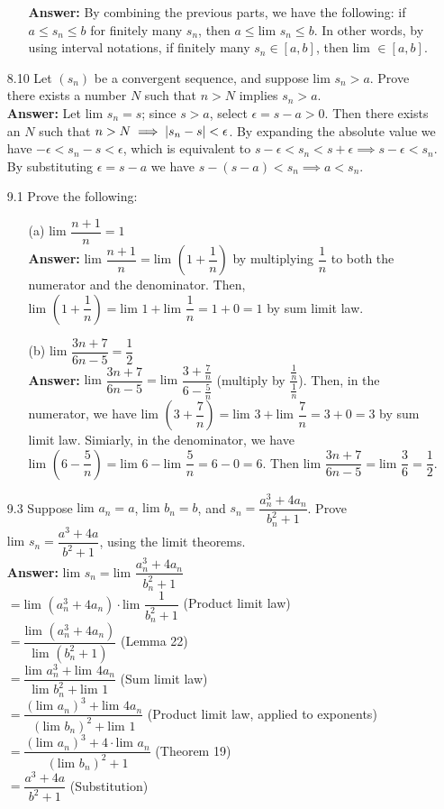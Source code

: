 \documentclass{article}
\begin{document}
\begin{itemize}
\begin{itemize}
                        \textbf{Answer: } By combining the previous parts, we have the following: if $a\leq s_n\leq b$ for finitely many $s_n$, then $a\leq \text{lim }s_n\leq b$. In other words, by using interval notations, if finitely many $s_n\in[a,b]$, then $\text{lim }\in[a,b]$.
            \end{itemize}
      \item [8.10] Let $(s_n)$ be a convergent sequence, and suppose $\text{lim }s_n>a$. Prove there exists a number $N$ such that $n>N$ implies $s_n>a$.\\
            \textbf{Answer: } Let $\text{lim }s_n=s$; since $s>a$, select $\epsilon=s-a>0$. Then there exists an $N$ such that $n>N\implies\abs{s_n-s}<\epsilon$. By expanding the absolute value we have $-\epsilon<s_n-s<\epsilon$, which is equivalent to $s-\epsilon<s_n<s+\epsilon\implies s-\epsilon<s_n$. By substituting $\epsilon=s-a$ we have $s-(s-a)<s_n\implies a<s_n$.
      \item [9.1] Prove the following:
            \begin{itemize}
                  \item [(a)] $\text{lim }\dfrac{n+1}{n}=1$\\
                        \textbf{Answer: } $\text{lim }\dfrac{n+1}{n}=\text{lim }(1+\dfrac{1}{n})$ by multiplying $\dfrac{1}{n}$ to both the numerator and the denominator. Then, $\text{lim }(1+\dfrac{1}{n})=\text{lim }1+\text{lim }\dfrac{1}{n}=1+0=1$ by sum limit law.
                  \item [(b)] $\text{lim }\dfrac{3n+7}{6n-5}=\dfrac{1}{2}$\\
                        \textbf{Answer: } $\text{lim }\dfrac{3n+7}{6n-5}=\text{lim }\dfrac{3+\frac{7}{n}}{6-\frac{5}{n}}$ (multiply by $\dfrac{\frac{1}{n}}{\frac{1}{n}}$). Then, in the numerator, we have $\text{lim }(3+\dfrac{7}{n})=\text{lim }3+\text{lim }\dfrac{7}{n}=3+0=3$ by sum limit law. Simiarly, in the denominator, we have $\text{lim }(6-\dfrac{5}{n})=\text{lim }6-\text{lim }\dfrac{5}{n}=6-0=6$. Then $\text{lim }\dfrac{3n+7}{6n-5}=\text{lim }\dfrac{3}{6}=\dfrac{1}{2}$.
            \end{itemize}
      \item [9.3] Suppose $\text{lim }a_n=a$, $\text{lim }b_n=b$, and $s_n=\dfrac{a_n^3+4a_n}{b_n^2+1}$. Prove $\text{lim }s_n=\dfrac{a^3+4a}{b^2+1}$, using the limit theorems.\\
            \textbf{Answer: } $\text{lim }s_n=\text{lim }\dfrac{a_n^3+4a_n}{b_n^2+1}$\\$=\text{lim }(a_n^3+4a_n)\cdot\text{lim }\dfrac{1}{b_n^2+1}$ (Product limit law)\\$=\dfrac{\text{lim }(a_n^3+4a_n)}{\text{lim }(b_n^2+1)}$ (Lemma 22)\\$=\dfrac{\text{lim }a_n^3+\text{lim }4a_n}{\text{lim }b_n^2+\text{lim }1}$ (Sum limit law)\\$=\dfrac{(\text{lim }a_n)^3+\text{lim }4a_n}{(\text{lim }b_n)^2+\text{lim }1}$ (Product limit law, applied to exponents)\\$=\dfrac{(\text{lim }a_n)^3+4\cdot\text{lim }a_n}{(\text{lim }b_n)^2+1}$ (Theorem 19)\\$=\dfrac{a^3+4a}{b^2+1}$ (Substitution)

\end{itemize}
\end{document}
